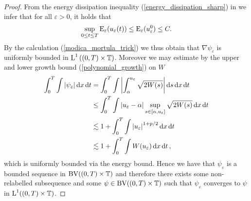 \begin{proof}
	From the energy dissipation inequality (\ref{energy_dissipation_sharp}) in  we infer that for all $ \varepsilon > 0 $, it holds that
	\begin{equation}
		\label{unif_bound_on_energies}
		\sup_{ 0 \leq t \leq T }
		\operatorname{E}_{ \varepsilon } ( u_{ \varepsilon } ( t ) ) 
		\leq
		\operatorname{E}_{ \varepsilon } ( u_{ \varepsilon}^{ 0 } )
		\leq C.
	\end{equation}
	By the calculation (\ref{modica_mortula_trick}) we thus obtain that $ 
	\nabla 
	\psi_{ \varepsilon } $ is uniformly bounded in $ \operatorname{L}^{ 1 } \left( ( 0 , T ) 
	\times \operatorname{\mathbb{T}} \right) $.
	Moreover we may estimate by the upper and lower growth bound 
	(\ref{polynomial_growth}) on $ W $ 
	\begin{align}
		\int_{ 0 }^{ T }
		\int
		\abs{ \psi_{ \varepsilon } }
		\dd{ x }
		\dd{ t }
		& =
		\int_{ 0 }^{ T }
		\int
		\abs{
			\int_{ \alpha }^{ u_{ \varepsilon } }
			\sqrt{ 2 W ( s ) }
		}
		\dd{ s }
		\dd{ x }
		\dd{ t }
		\notag
		\\
		& \leq
		\int_{ 0 }^{ T }
		\int
		\abs{ u_{ \varepsilon } - \alpha }
		\sup_{ s \in [ \alpha, u_{ \varepsilon } ] }
		\sqrt{ 2 W ( s ) }
		\dd{ x }
		\dd{ t }
		\notag
		\\
		& \lesssim
		1 + 
		\int_{ 0 }^{ T }
		\int
		\abs{ u_{ \varepsilon } }^{ 1 + p/ 2 }
		\dd{ x }
		\dd{ t }
		\notag
		\\
		& \lesssim
		1 + 
		\int_{ 0 }^{ T }
		\int
		W ( u_{ \varepsilon } )
		\dd{ x }
		\dd{ t },
		\label{l1_estimate_for_psi_epsilon}
	\end{align}
	which is uniformly bounded via the energy bound. Hence we have that $ 
	\psi_{ \varepsilon } $ is a bounded sequence in $ \operatorname{BV}( ( 0 , T ) \times 
	\operatorname{\mathbb{T}} ) $ and therefore there exists some non-relabelled subsequence 
	and some $ \psi \in \operatorname{BV} ( ( 0 , T ) \times \operatorname{\mathbb{T}} ) $ such that $ 
	\psi_{ \varepsilon } $ converges to $ \psi $ in $ \operatorname{L}^{ 1 } ( ( 0 , T ) 
	\times \operatorname{\mathbb{T}} ) $.
	

\end{proof}
